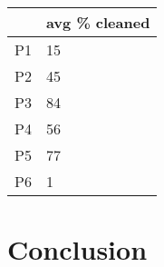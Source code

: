 \documentclass[letterpaper]{article}
\begin{document}
\begin{tabular}{ r | l }  
	\toprule
		& avg \% cleaned \\
	\midrule
	P1	& 15 \\
	P2	& 45 \\
	P3	& 84 \\
	P4	& 56 \\
	P5	& 77 \\
	P6	& 1 \\
	\bottomrule
\end{tabular}

\section{Conclusion}


\nocite{*}


\end{document}

